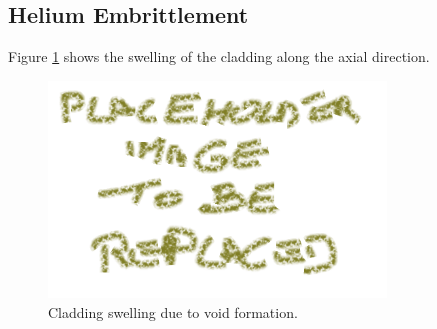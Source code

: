\subsection{Helium Embrittlement}
Figure \ref{fig:he_embrittlment} shows the swelling of the cladding along the axial direction.

\begin{figure}[H]
\centering
\includegraphics[width=0.8\textwidth]{placeholder.png}
\caption{Cladding swelling due to void formation.}
\label{fig:he_embrittlment}
\end{figure}

